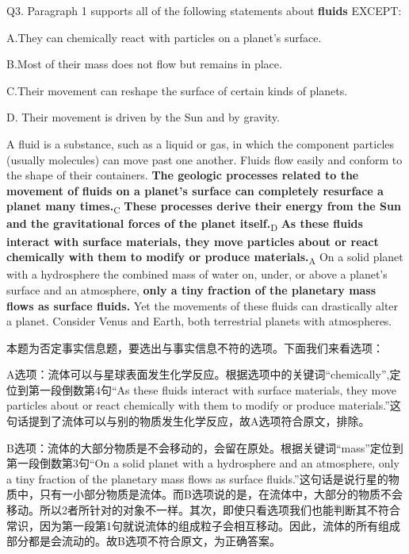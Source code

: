 \begin{blk}
    \begin{qst}
        Q3. Paragraph 1 supports all of the following statements about \textbf{fluids} EXCEPT:
    \end{qst}

    \begin{chc}
        A.They can chemically react with particles on a planet’s surface.

        B.Most of their mass does not flow but remains in place.

        C.Their movement can reshape the surface of certain kinds of planets.

        D. Their movement is driven by the Sun and by gravity.
    \end{chc}

    \begin{psgq}
        A fluid is a substance, such as a liquid or gas, in which the component particles (usually molecules) can move past one another. Fluids flow easily and conform to the shape of their containers. \textbf{The geologic processes related to the movement of fluids on a planet’s surface can completely resurface a planet many times.}\textsubscript{C} \textbf{These processes derive their energy from the Sun and the gravitational forces of the planet itself.}\textsubscript{D} \textbf{As these fluids interact with surface materials, they move particles about or react chemically with them to modify or produce materials.}\textsubscript{A} On a solid planet with a hydrosphere the combined mass of water on, under, or above a planet’s surface and an atmosphere, \textbf{only a tiny fraction of the planetary mass flows as surface fluids.} Yet the movements of these fluids can drastically alter a planet. Consider Venus and Earth, both terrestrial planets with atmospheres.
    \end{psgq}

    \begin{nlz}
        本题为否定事实信息题，要选出与事实信息不符的选项。下面我们来看选项：

        A选项：流体可以与星球表面发生化学反应。根据选项中的关键词“chemically”,定位到第一段倒数第4句“As these fluids interact with surface materials, they move particles about or react chemically with them to modify or produce materials.”这句话提到了流体可以与别的物质发生化学反应，故A选项符合原文，排除。

        B选项：流体的大部分物质是不会移动的，会留在原处。根据关键词“mass”定位到第一段倒数第3句“On a solid planet with a hydrosphere and an atmosphere, only a tiny fraction of the planetary mass flows as surface fluids.”这句话是说行星的物质中，只有一小部分物质是流体。而B选项说的是，在流体中，大部分的物质不会移动。所以2者所针对的对象不一样。其次，即使只看选项我们也能判断其不符合常识，因为第一段第1句就说流体的组成粒子会相互移动。因此，流体的所有组成部分都是会流动的。故B选项不符合原文，为正确答案。


\end{nlz}
\end{blk}
